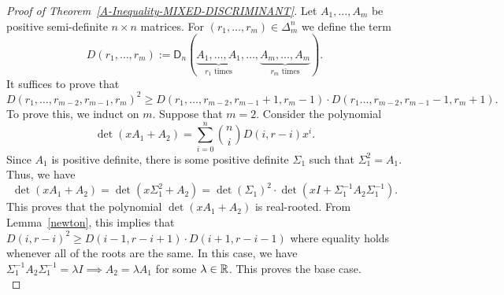 \documentclass{puthesis-UG}
\begin{document}
\begin{proof}[Proof of Theorem~\ref{A-Inequality-MIXED-DISCRIMINANT}]
	Let $A_1, \ldots, A_m$ be positive semi-definite $n \times n$ matrices. For $(r_1, \ldots, r_m) \in \Delta_m^{n}$ we define the term
	\[
		D(r_1, \ldots, r_m) := \mathsf{D}_n \left ( \underbrace{A_1, \ldots, A_1}_{r_1 \text{ times}}, \ldots, \underbrace{A_m, \ldots, A_m}_{r_m \text{ times}} \right ).
	\] 
	It suffices to prove that 
	\[
		D(r_1, \ldots, r_{m-2}, r_{m-1}, r_m)^2 \geq D(r_1, \ldots, r_{m-2}, r_{m-1}+1, r_m-1) \cdot D(r_1 \ldots, r_{m-2}, r_{m-1}-1, r_m+1).
	\]
	To prove this, we induct on $m$. Suppose that $m=2$. Consider the polynomial 
	\[
		\det (xA_1 + A_2) = \sum_{i = 0}^n \binom{n}{i} D(i, r-i) x^i.
	\]
	Since $A_1$ is positive definite, there is some positive definite $\Sigma_1$ such that $\Sigma_1^2 = A_1$. Thus, we have 
	\[
		\det (xA_1 + A_2) = \det (x\Sigma_1^2 + A_2) = \det (\Sigma_1)^2 \cdot \det (x I + \Sigma_1^{-1} A_2 \Sigma_1^{-1}).
	\]
	This proves that the polynomial $\det (xA_1 + A_2)$ is real-rooted. From Lemma~\ref{newton}, this implies that $D(i, r-i)^2 \geq D(i-1, r-i+1) \cdot D(i+1, r-i-1)$ where equality holds whenever all of the roots are the same. In this case, we have $\Sigma_1^{-1} A_2 \Sigma_1^{-1} = \lambda I \implies A_2 = \lambda A_1$ for some $\lambda \in \mathbb{R}$. This proves the base case. \\


\end{proof}
\end{document}
